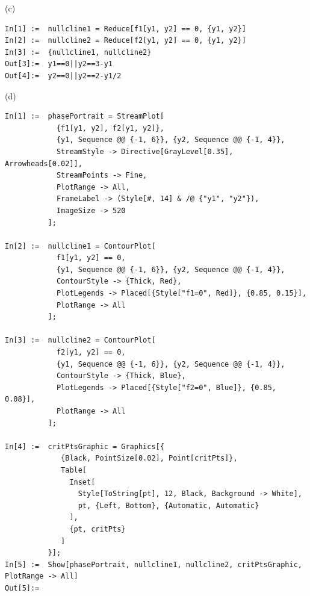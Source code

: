 \documentclass[a4paper,11pt]{report}
\begin{document}
\sol (c)
\begin{lstlisting}
In[1] :=  nullcline1 = Reduce[f1[y1, y2] == 0, {y1, y2}]
In[2] :=  nullcline2 = Reduce[f2[y1, y2] == 0, {y1, y2}]
In[3] :=  {nullcline1, nullcline2}
Out[3]:=  y1==0||y2==3-y1
Out[4]:=  y2==0||y2==2-y1/2 
\end{lstlisting}

\sol(d)
\begin{lstlisting}
In[1] :=  phasePortrait = StreamPlot[
            {f1[y1, y2], f2[y1, y2]},
            {y1, Sequence @@ {-1, 6}}, {y2, Sequence @@ {-1, 4}},
            StreamStyle -> Directive[GrayLevel[0.35], Arrowheads[0.02]],
            StreamPoints -> Fine,
            PlotRange -> All,
            FrameLabel -> (Style[#, 14] & /@ {"y1", "y2"}),
            ImageSize -> 520
          ];
  
In[2] :=  nullcline1 = ContourPlot[
            f1[y1, y2] == 0,
            {y1, Sequence @@ {-1, 6}}, {y2, Sequence @@ {-1, 4}},
            ContourStyle -> {Thick, Red},
            PlotLegends -> Placed[{Style["f1=0", Red]}, {0.85, 0.15}],
            PlotRange -> All
          ];

In[3] :=  nullcline2 = ContourPlot[
            f2[y1, y2] == 0,
            {y1, Sequence @@ {-1, 6}}, {y2, Sequence @@ {-1, 4}},
            ContourStyle -> {Thick, Blue},
            PlotLegends -> Placed[{Style["f2=0", Blue]}, {0.85, 0.08}],
            PlotRange -> All
          ];

In[4] :=  critPtsGraphic = Graphics[{
             {Black, PointSize[0.02], Point[critPts]},
             Table[
               Inset[
                 Style[ToString[pt], 12, Black, Background -> White],
                 pt, {Left, Bottom}, {Automatic, Automatic}
               ],
               {pt, critPts}
             ]
          }];  
In[5] :=  Show[phasePortrait, nullcline1, nullcline2, critPtsGraphic, PlotRange -> All]
Out[5]:=
\end{lstlisting}
\end{document}
